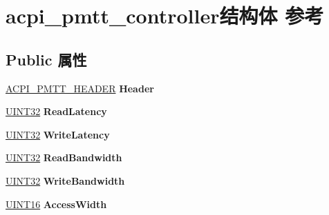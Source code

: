 \hypertarget{structacpi__pmtt__controller}{}\section{acpi\+\_\+pmtt\+\_\+controller结构体 参考}
\label{structacpi__pmtt__controller}
\subsection*{Public 属性}
\begin{DoxyCompactItemize}
\item 
\mbox{\label{structacpi__pmtt__controller_aa14e6ce1a3ed4ac7af5d17895fa2505a}} 
\hyperlink{structacpi__pmtt__header}{A\+C\+P\+I\+\_\+\+P\+M\+T\+T\+\_\+\+H\+E\+A\+D\+ER} {\bfseries Header}
\item 
\mbox{\label{structacpi__pmtt__controller_af6adb003858b7bb3d669f3ab3b1391fd}} 
\hyperlink{_processor_bind_8h_ae1e6edbbc26d6fbc71a90190d0266018}{U\+I\+N\+T32} {\bfseries Read\+Latency}
\item 
\mbox{\label{structacpi__pmtt__controller_aad5690f8372448cc6dff3a31e6dd437f}} 
\hyperlink{_processor_bind_8h_ae1e6edbbc26d6fbc71a90190d0266018}{U\+I\+N\+T32} {\bfseries Write\+Latency}
\item 
\mbox{\label{structacpi__pmtt__controller_ab7da2742ea4aeb809cdd687fe2944caa}} 
\hyperlink{_processor_bind_8h_ae1e6edbbc26d6fbc71a90190d0266018}{U\+I\+N\+T32} {\bfseries Read\+Bandwidth}
\item 
\mbox{\label{structacpi__pmtt__controller_afa11c5b0a898c8c8af36d02902aad4cd}} 
\hyperlink{_processor_bind_8h_ae1e6edbbc26d6fbc71a90190d0266018}{U\+I\+N\+T32} {\bfseries Write\+Bandwidth}
\item 
\mbox{\label{structacpi__pmtt__controller_a21eeab933803224d957dcf5ef8d01e2d}} 
\hyperlink{_processor_bind_8h_a09f1a1fb2293e33483cc8d44aefb1eb1}{U\+I\+N\+T16} {\bfseries Access\+Width}
\item 
\mbox{\label{structacpi__pmtt__controller_adf776f5b25724362b6ee00f1bde8d7d1}} 

\end{DoxyCompactItemize}
